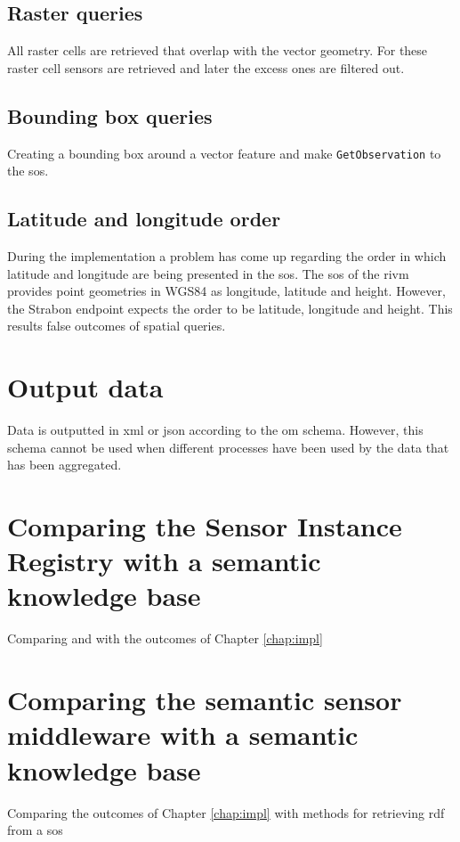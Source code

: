 \subsection{Raster queries}
All raster cells are retrieved that overlap with the vector geometry. For these raster cell sensors are retrieved and later the excess ones are filtered out. 

\subsection{Bounding box queries}
Creating a bounding box around a vector feature and make \texttt{GetObservation} to the \ac{sos}.  

\subsection{Latitude and longitude order}
During the implementation a problem has come up regarding the order in which latitude and longitude are being presented in the \ac{sos}. The \ac{sos} of the \ac{rivm} provides point geometries in WGS84 as longitude, latitude and height. However, the Strabon endpoint expects the order to be latitude, longitude and height. This results false outcomes of spatial queries.    

\section{Output data}
Data is outputted in \ac{xml} or \ac{json} according to the \ac{om} schema. However, this schema cannot be used when different processes have been used by the data that has been aggregated.

\section{Comparing the Sensor Instance Registry with a semantic knowledge base}
Comparing \cite{SW:OGC3} and \cite{SW:OGC4} with the outcomes of Chapter \ref{chap:impl}

\section{Comparing the semantic sensor middleware with a semantic knowledge base}
Comparing the outcomes of Chapter \ref{chap:impl} with methods for retrieving \ac{rdf} from a \ac{sos}
